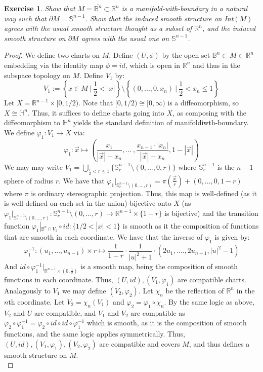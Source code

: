 \documentclass{article}
\newcommand{\bb}[1]{\mathbb{#1}}
\newcommand{\iso}{\cong}
\newtheorem{exercise}{Exercise}
\begin{document}
\begin{exercise}
  Show that $M = \overline{\bb{B}^{n}} \subset \bb{R}^{n}$ is a manifold-with-boundary in a natural way such that $\partial M = \bb{S}^{n-1}$. Show that the induced smooth structure on Int$(M)$ agrees with the usual smooth structure thought as a subset of $\bb{R}^{n}$, and the induced smooth structure on $\partial M$ agrees with the usual one on $\bb{S}^{n-1}$.  
\end{exercise}
\begin{proof}
  We define two charts on $M$. Define $(U,\phi)$ by the open set $\bb{B}^{n} \subset M \subset \bb{R}^{n}$ embedding via the identity map $\phi = id$, which is open in $\bb{R}^{n}$ and thus in the subspace topology on $M$. Define $V_{1}$ by:
  \[
    V_{1} := \left\{x \in M \ \Big| \ \frac{1}{2} < |x|\right\} \setminus \left\{(0,...,0,x_{n}) \ \Big| \ \frac{1}{2} < x_{n} \leq 1\right\}
  \]
  Let $X = \bb{R}^{n-1} \times [0,1/2)$. Note that $[0,1/2) \iso [0, \infty)$ is a diffeomorphism, so $X \iso \bb{H}^{n}$. Thus, it suffices to define charts going into $X$, as composing with the diffeomorphism to $\bb{H}^{n}$ yields the standard definition of manifoldiwth-boundary. We define $\varphi_{1}: V_{1} \to X$ via:
  \[
    \varphi_{1}: \vec{x} \mapsto \left(\frac{x_{1}}{|\vec{x}| - x_{n}},... \ , \frac{x_{n-1} \cdot |x_{n}|}{|\vec{x}| - x_{n}}, 1 - |\vec{x}| \right)
  \]
  We may may write $V_{1} = \bigcup_{\frac{1}{2} < r \leq 1} \{\bb{S}^{n-1}_{r} \setminus (0,...,0,r)\}$ where $\bb{S}^{n-1}_{r}$ is the $n-1$-sphere of radius $r$. We have that $\varphi_{1}|_{\bb{S}^{n-1}_{r}\setminus (0,...,r)} = \pi(\frac{\vec{x}}{r}) + (0,...,0,1-r)$ where $\pi$ is ordinary stereographic projection. Thus, this map is well-defined (as it is well-defined on each set in the union) bijective onto $X$ (as $\varphi_{1}|_{\bb{S}^{n-1}_{r}\setminus (0,...,r) }: \bb{S}^{n-1}_{r}\setminus (0,...,r) \to \bb{R}^{n-1} \times \{1-r\}$ is bijective) and the transition function $\varphi_{1}|_{\bb{B}^{n} \cap V_{1}} \circ id : \{1/2 < |x| < 1\}$ is smooth as it the composition of functions that are smooth in each coordinate. We have that the inverse of $\varphi_{1}$ is given by:
  \[
    \varphi_{1}^{-1}: (u_{1},...,u_{n-1}) \times r \mapsto \frac{1}{1-r}\cdot\frac{1}{|u|^{2}+1} \cdot(2u_{1},....,2u_{n-1}, |u|^{2}-1)
  \]
  And $id \circ \varphi_{1}^{-1}|_{\bb{R}^{n-1}\times(0,\frac{1}{2})}$ is a smooth map, being the composition of smooth functions in each coordinate. Thus, $(U, id), (V_{1}, \varphi_{1})$ are compatible charts. Analagously to $V_{1}$ we may define $(V_{2}, \varphi_{2})$. Let $\chi_{n}$ be the reflection of $\bb{R}^{n}$ in the $n$th coordinate. Let $V_{2} = \chi_{n}(V_{1})$ and $\varphi_{2} = \varphi_{1} \circ \chi_{n}$. By the same logic as above, $V_{2}$ and $U$ are compatible, and $V_{1}$ and $V_{2}$ are compatible as $\varphi_{2} \circ \varphi_{1}^{-1} = \varphi_{2} \circ id \circ id \circ \varphi_{1}^{-1}$ which is smooth, as it is the composition of smooth functions, and the same logic applies symmetrically. Thus, $(U, id), (V_{1}, \varphi_{1}), (V_{2}, \varphi_{2})$ are compatible and covers $M$, and thus defines a smooth structure on $M$. \\


\end{proof}
\end{document}
